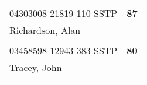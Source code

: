 \documentclass[a4paper,12pt]{article}
\begin{document}
\begin{tabular}{
   |p{9mm}|
    p{9mm}|
    p{9mm}|
    p{9mm}|
    p{9mm}|
    p{9mm}|
    p{9mm}|
    p{9mm}|
    p{9mm}|
    p{9mm}|}
      &    &    &    &    &    &    &    &    &     \\
\hline\hline
\multicolumn{9}{|l|}{04303008 21819 110 SSTP} & \textbf{87} \\
\hline
\multicolumn{10}{|l|}{Richardson, Alan} \\
\hline
   \vrule height8mm width0pt depth2mm 
      &    &    &    &    &    &    &    &    &     \\
\hline\hline
\multicolumn{9}{|l|}{03458598 12943 383 SSTP} & \textbf{80} \\
\hline
\multicolumn{10}{|l|}{Tracey, John} \\
\hline
   \vrule height8mm width0pt depth2mm 
      &    &    &    &    &    &    &    &    &     \\
\hline\hline
\end{tabular}
\newpage
\end{document}
